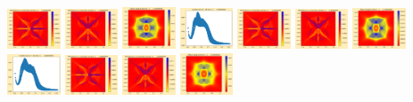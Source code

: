 \documentclass[11pt]{article}
\begin{document}
\includegraphics[width=0.11875\textwidth]{frame0032fig2.png}
\includegraphics[width=0.11875\textwidth]{frame0032fig3.png}
\includegraphics[width=0.11875\textwidth]{frame0033fig0.png}
\includegraphics[width=0.11875\textwidth]{frame0033fig1.png}
\includegraphics[width=0.11875\textwidth]{frame0033fig2.png}
\includegraphics[width=0.11875\textwidth]{frame0033fig3.png}
\vskip 10pt 
\includegraphics[width=0.11875\textwidth]{frame0034fig0.png}
\includegraphics[width=0.11875\textwidth]{frame0034fig1.png}
\includegraphics[width=0.11875\textwidth]{frame0034fig2.png}
\includegraphics[width=0.11875\textwidth]{frame0034fig3.png}
\includegraphics[width=0.11875\textwidth]{frame0035fig0.png}
\end{document}
